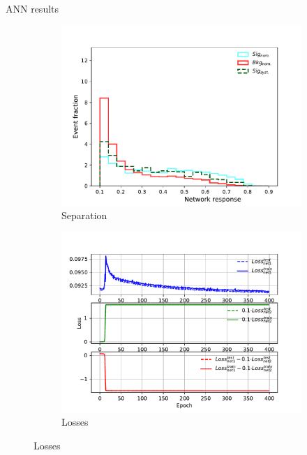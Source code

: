 \documentclass[10pt, UKenglish]{beamer}
\begin{document}
\begin{frame}{ANN results}
\begin{figure}[htbp]
    \centering
    \begin{subfigure}[b]{0.4\textwidth}
		\includegraphics[width=\textwidth]{app2_syst.pdf}
		\caption{Separation}
		\label{fig:simple:final:roc}
	\end{subfigure}
\quad
	\begin{subfigure}[b]{0.4\textwidth}
		\includegraphics[width=\textwidth]{app2_losses2.pdf}
		\caption{Losses}
		\label{fig:simple:final:loss}
	\end{subfigure}
\end{figure}
\end{frame}
\end{document}
